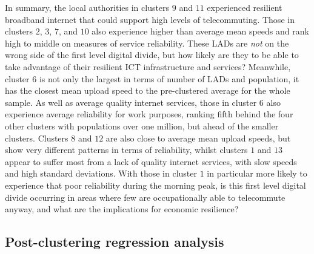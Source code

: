 \documentclass[Royal,times,sageh]{sagej}
\begin{document}
In summary, the local authorities in clusters \(9\) and \(11\)
experienced resilient broadband internet that could support high levels
of telecommuting. Those in clusters \(2\), \(3\), \(7\), and \(10\) also
experience higher than average mean speeds and rank high to middle on
measures of service reliability. These LADs are \emph{not} on the wrong
side of the first level digital divide, but how likely are they to be
able to take advantage of their resilient ICT infrastructure and
services? Meanwhile, cluster \(6\) is not only the largest in terms of
number of LADs and population, it has the closest mean upload speed to
the pre-clustered average for the whole sample. As well as average
quality internet services, those in cluster \(6\) also experience
average reliability for work purposes, ranking fifth behind the four
other clusters with populations over one million, but ahead of the
smaller clusters. Clusters \(8\) and \(12\) are also close to average
mean upload speeds, but show very different patterns in terms of
reliability, whilst clusters \(1\) and \(13\) appear to suffer most from
a lack of quality internet services, with slow speeds and high standard
deviations. With those in cluster \(1\) in particular more likely to
experience that poor reliability during the morning peak, is this first
level digital divide occurring in areas where few are occupationally
able to telecommute anyway, and what are the implications for economic
resilience?

\hypertarget{sec:4.2}{%
\subsection{Post-clustering regression analysis}\label{sec:4.2}}
\end{document}
